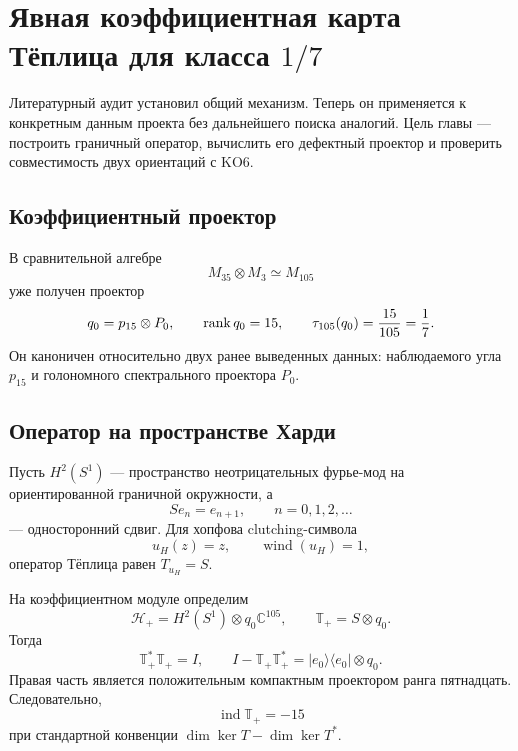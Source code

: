\chapter{Явная коэффициентная карта Тёплица для класса \texorpdfstring{$1/7$}{1/7}}

Литературный аудит установил общий механизм. Теперь он применяется к
конкретным данным проекта без дальнейшего поиска аналогий. Цель главы ---
построить граничный оператор, вычислить его дефектный проектор и проверить
совместимость двух ориентаций с KO6.

\section{Коэффициентный проектор}

В сравнительной алгебре
\begin{equation}
 M_{35}\otimes M_3\simeq M_{105}
\end{equation}
уже получен проектор
\begin{equation}
 q_0=p_{15}\otimes P_0,
 \qquad
 \operatorname{rank} q_0=15,
 \qquad
 \tau_{105}(q_0)=\frac{15}{105}=\frac17.
 \label{eq:v5-toeplitz-q0}
\end{equation}
Он каноничен относительно двух ранее выведенных данных: наблюдаемого угла
$p_{15}$ и голономного спектрального проектора $P_0$.

\section{Оператор на пространстве Харди}

Пусть $H^2(S^1)$ --- пространство неотрицательных фурье-мод на
ориентированной граничной окружности, а
\begin{equation}
 S e_n=e_{n+1},
 \qquad n=0,1,2,\ldots
\end{equation}
--- односторонний сдвиг. Для хопфова clutching-символа
\begin{equation}
 u_H(z)=z,
 \qquad \operatorname{wind}(u_H)=1,
\end{equation}
оператор Тёплица равен $T_{u_H}=S$.

На коэффициентном модуле определим
\begin{equation}
 \mathcal H_+=H^2(S^1)\otimes q_0\mathbb C^{105},
 \qquad
 \mathbb T_+=S\otimes q_0.
 \label{eq:v5-toeplitz-coefficient-operator}
\end{equation}
Тогда
\begin{equation}
 \mathbb T_+^*\mathbb T_+=I,
 \qquad
 I-\mathbb T_+\mathbb T_+^*
 =|e_0\rangle\langle e_0|\otimes q_0.
 \label{eq:v5-toeplitz-defect-projection}
\end{equation}
Правая часть является положительным компактным проектором ранга
пятнадцать. Следовательно,
\begin{equation}
 \operatorname{ind}\mathbb T_+=-15
\end{equation}
при стандартной конвенции $\dim\ker T-\dim\ker T^*$.

